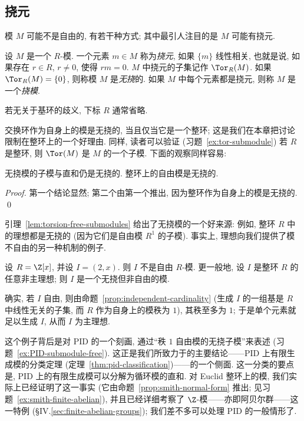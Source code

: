 \subsection{挠元}\label{subsec:torsion}

模 $M$ 可能不是自由的, 有若干种方式; 其中最引人注目的是 $M$ 可能有挠元.

\begin{definition}\label{def:torsion}
设 $M$ 是一个 $R$-模. 一个元素 $m\in M$ 称为\emph{挠元}, 如果 $\{m\}$ 线性相关, 也就是说, 如果存在 $r\in R$, $r\neq 0$, 使得 $rm=0$. $M$ 中挠元的子集记作 $\Tor_R(M)$. 如果 $\Tor_R(M)=\{0\}$, 则称模 $M$ 是\emph{无挠}的. 如果 $M$ 中每个元素都是挠元, 则称 $M$ 是一个\emph{挠模}.
\end{definition}

若无关于基环的歧义, 下标 $R$ 通常省略.

交换环作为自身上的模是无挠的, 当且仅当它是一个整环; 这是我们在本章把讨论限制在整环上的一个好理由. 同样, 读者可以验证 (习题~\ref{ex:tor-submodule}) 若 $R$ 是整环, 则 $\Tor(M)$ 是 $M$ 的一个子模. 下面的观察同样容易:

\begin{lemma}\label{lem:torsion-free-submodules}
无挠模的子模与直和仍是无挠的. 整环上的自由模是无挠的.
\end{lemma}

\begin{proof}
第一个结论显然; 第二个由第一个推出, 因为整环作为自身上的模是无挠的. \qed
\end{proof}

引理~\ref{lem:torsion-free-submodules} 给出了无挠模的一个好来源: 例如, 整环 $R$ 中的理想都是无挠的 (因为它们是自由模 $R^1$ 的子模). 事实上, 理想向我们提供了模不自由的另一种机制的例子.

\begin{example}\label{ex:torsion-free-nonfree-ideal}
设 $R=\Z[x]$, 并设 $I=(2,x)$. 则 $I$ 不是自由 $R$-模. 更一般地, 设 $I$ 是整环 $R$ 的任意非主理想; 则 $I$ 是一个无挠但非自由的模.
\end{example}

确实, 若 $I$ 自由, 则由命题~\ref{prop:independent-cardinality} (生成 $I$ 的一组基是 $R$ 中线性无关的子集, 而 $R$ 作为自身上的模秩为 $1$), 其秩至多为 $1$; 于是单个元素就足以生成 $I$, 从而 $I$ 为主理想.

这个例子背后是对 PID 的一个刻画, 通过“秩 $1$ 自由模的无挠子模”来表述 (习题~\ref{ex:PID-submodule-free}). 这正是我们所致力于的主要结论——PID 上有限生成模的分类定理 (定理~\ref{thm:pid-classification})——的一个侧面. 这一分类的要点是, PID 上的有限生成模可以分解为循环模的直和. 对 Euclid 整环上的模, 我们实际上已经证明了这一事实 (它由命题~\ref{prop:smith-normal-form} 推出; 见习题~\ref{ex:smith-finite-abelian}), 并且已经详细考察了 $\Z$-模——亦即阿贝尔群——这一特例 (§IV.\ref{sec:finite-abelian-groups}); 我们差不多可以处理 PID 的一般情形了.

